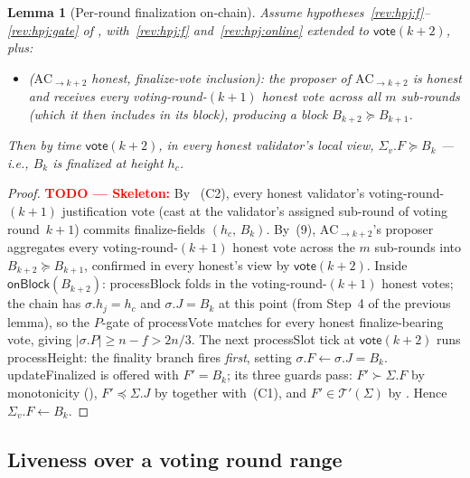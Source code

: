\ifx\litemode\undefined\documentclass{article}\fi
\newcommand{\viableTree}{\ensuremath{\mathcal{T}'}}
\newcommand{\processSlot}{\textsf{processSlot}\xspace}
\newcommand{\processBlock}{\textsf{processBlock}\xspace}
\newcommand{\processHeight}{\textsf{processHeight}\xspace}
\newcommand{\processVote}{\textsf{processVote}\xspace}
\newcommand{\vote}{\ensuremath{\mathsf{vote}}}
\newcommand{\onBlock}{\textsf{onBlock}\xspace}
\newcommand{\updateFinalized}{\textsf{updateFinalized}\xspace}
\theoremstyle{plain}
\newtheorem{lemmaboth}[lemma]{Lemma}
\theoremstyle{definition}
\theoremstyle{remark}
\begin{document}
\begin{lemmaboth}[Per-round finalization on-chain]\label{lem:per-round-finalization}
Assume hypotheses~\ref{rev:hpj:f}--\ref{rev:hpj:gate} of , with~\ref{rev:hpj:f} and~\ref{rev:hpj:online} extended to $\vote(k+2)$, plus:
\begin{itemize}
  \item[\textnormal{(9)}]\label{rev:hpf:ack2-honest} \emph{($\mathrm{AC}_{\to k+2}$ honest, finalize-vote inclusion):} the proposer of $\mathrm{AC}_{\to k+2}$ is honest and receives every voting-round-$(k+1)$ honest vote across all $m$ sub-rounds (which it then includes in its block), producing a block $B_{k+2} \succeq B_{k+1}$.
\end{itemize}

Then by time $\vote(k+2)$, in every honest validator's local view, $\Sigma_v.F \succeq B_k$ --- i.e., $B_k$ is finalized at height $h_c$.
\end{lemmaboth}

\begin{proof}
\textcolor{red}{\textbf{TODO --- Skeleton:}}
By ~(C2), every honest validator's voting-round-$(k+1)$ justification vote (cast at the validator's assigned sub-round of voting round~$k+1$) commits finalize-fields $(h_c,\, B_k)$.
By~(9), $\mathrm{AC}_{\to k+2}$'s proposer aggregates every voting-round-$(k+1)$ honest vote across the $m$ sub-rounds into $B_{k+2} \succeq B_{k+1}$, confirmed in every honest's view by $\vote(k+2)$.
Inside $\onBlock(B_{k+2})$: \processBlock{} folds in the voting-round-$(k+1)$ honest votes; the chain has $\sigma.h_j = h_c$ and $\sigma.J = B_k$ at this point (from Step~4 of the previous lemma), so the $P$-gate of \processVote{} matches for every honest finalize-bearing vote, giving $|\sigma.P| \geq n - f > 2n/3$.
The next \processSlot{} tick at $\vote(k+2)$ runs \processHeight{}: the finality branch fires \emph{first}, setting $\sigma.F \gets \sigma.J = B_k$.
\updateFinalized{} is offered with $F' = B_k$; its three guards pass: $F' \succ \Sigma.F$ by monotonicity (), $F' \preceq \Sigma.J$ by  together with~(C1), and $F' \in \viableTree(\Sigma)$ by .
Hence $\Sigma_v.F \gets B_k$.
\end{proof}

\subsection{Liveness over a voting round range}\label{sec:liveness-range}
\end{document}
